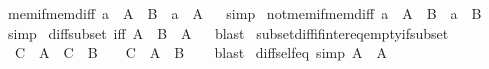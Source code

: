 \begin{isabellebody}
\endisatagproof
{\isafoldproof}%
%
\isadelimproof
\isanewline
%
\endisadelimproof
\isanewline
{}\isamarkupfalse%
\ mem{\isacharunderscore}{\kern0pt}if{\isacharunderscore}{\kern0pt}mem{\isacharunderscore}{\kern0pt}diff{\isacharcolon}{\kern0pt}\ {\isachardoublequoteopen}a\ {\isasymin}\ A\ {\isasymsetminus}\ B\ {\isasymLongrightarrow}\ a\ {\isasymin}\ A{\isachardoublequoteclose}%
\isadelimproof
\ %
\endisadelimproof
%
\isatagproof
{}\isamarkupfalse%
\ simp%
\endisatagproof
{\isafoldproof}%
%
\isadelimproof
%
\endisadelimproof
\isanewline
\isanewline
{}\isamarkupfalse%
\ not{\isacharunderscore}{\kern0pt}mem{\isacharunderscore}{\kern0pt}if{\isacharunderscore}{\kern0pt}mem{\isacharunderscore}{\kern0pt}diff{\isacharcolon}{\kern0pt}\ {\isachardoublequoteopen}a\ {\isasymin}\ A\ {\isasymsetminus}\ B\ {\isasymLongrightarrow}\ a\ {\isasymnotin}\ B{\isachardoublequoteclose}%
\isadelimproof
\ %
\endisadelimproof
%
\isatagproof
{}\isamarkupfalse%
\ simp%
\endisatagproof
{\isafoldproof}%
%
\isadelimproof
%
\endisadelimproof
\isanewline
\isanewline
{}\isamarkupfalse%
\ diff{\isacharunderscore}{\kern0pt}subset\ {\isacharbrackleft}{\kern0pt}iff{\isacharbrackright}{\kern0pt}{\isacharcolon}{\kern0pt}\ {\isachardoublequoteopen}A\ {\isasymsetminus}\ B\ {\isasymsubseteq}\ A{\isachardoublequoteclose}%
\isadelimproof
\ %
\endisadelimproof
%
\isatagproof
{}\isamarkupfalse%
\ blast%
\endisatagproof
{\isafoldproof}%
%
\isadelimproof
%
\endisadelimproof
\isanewline
\isanewline
{}\isamarkupfalse%
\ subset{\isacharunderscore}{\kern0pt}diff{\isacharunderscore}{\kern0pt}if{\isacharunderscore}{\kern0pt}inter{\isacharunderscore}{\kern0pt}eq{\isacharunderscore}{\kern0pt}empty{\isacharunderscore}{\kern0pt}if{\isacharunderscore}{\kern0pt}subset{\isacharcolon}{\kern0pt}\isanewline
\ \ {\isachardoublequoteopen}C\ {\isasymsubseteq}\ A\ {\isasymLongrightarrow}\ C\ {\isasyminter}\ B\ {\isacharequal}{\kern0pt}\ {\isacharbraceleft}{\kern0pt}{\isacharbraceright}{\kern0pt}\ {\isasymLongrightarrow}\ C\ {\isasymsubseteq}\ A\ {\isasymsetminus}\ B{\isachardoublequoteclose}\isanewline
%
\isadelimproof
\ \ %
\endisadelimproof
%
\isatagproof
{}\isamarkupfalse%
\ blast%
\endisatagproof
{\isafoldproof}%
%
\isadelimproof
\isanewline
%
\endisadelimproof
\isanewline
{}\isamarkupfalse%
\ diff{\isacharunderscore}{\kern0pt}self{\isacharunderscore}{\kern0pt}eq\ {\isacharbrackleft}{\kern0pt}simp{\isacharbrackright}{\kern0pt}{\isacharcolon}{\kern0pt}\ {\isachardoublequoteopen}A\ {\isasymsetminus}\ A\ {\isacharequal}{\kern0pt}\ {\isacharbraceleft}{\kern0pt}{\isacharbraceright}{\kern0pt}{\isachardoublequoteclose}%

\end{isabellebody}
